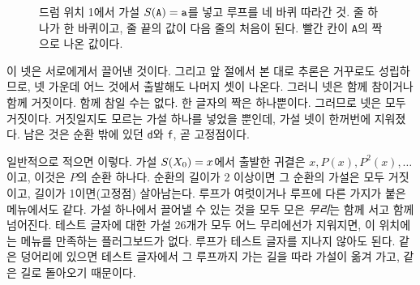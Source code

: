 \begin{figure}[ht]
\centering
{}
\caption{드럼 위치 1에서 가설 $S(\mathtt{A}) = \mathtt{a}$를 넣고 루프를 네 바퀴 따라간 것. 줄 하나가 한 바퀴이고,
줄 끝의 값이 다음 줄의 처음이 된다. 빨간 칸이 \texttt{A}의 짝으로 나온 값이다.}
\label{fig:ac-orbit}
\end{figure}

이 넷은 서로에게서 끌어낸 것이다. 그리고 앞 절에서 본 대로 추론은 거꾸로도 성립하므로, 넷 가운데 어느 것에서
출발해도 나머지 셋이 나온다. 그러니 넷은 함께 참이거나 함께 거짓이다. 함께 참일 수는 없다. 한 글자의 짝은 하나뿐이다.
그러므로 넷은 모두 거짓이다. 거짓일지도 모르는 가설 하나를 넣었을 뿐인데, 가설 넷이 한꺼번에 지워졌다. 남은 것은
순환 밖에 있던 \texttt{d}와 \texttt{f}, 곧 고정점이다.

일반적으로 적으면 이렇다. 가설 $S(X_0) = x$에서 출발한 귀결은 $x, P(x), P^2(x), \ldots$이고, 이것은 $P$의 순환
하나다. 순환의 길이가 2 이상이면 그 순환의 가설은 모두 거짓이고, 길이가 1이면(고정점) 살아남는다. 루프가 여럿이거나
루프에 다른 가지가 붙은 메뉴에서도 같다. 가설 하나에서 끌어낼 수 있는 것을 모두 모은 \emph{무리}는 함께 서고 함께
넘어진다. 테스트 글자에 대한 가설 26개가 모두 어느 무리에선가 지워지면, 이 위치에는 메뉴를 만족하는 플러그보드가
없다. 루프가 테스트 글자를 지나지 않아도 된다. 같은 덩어리에 있으면 테스트 글자에서 그 루프까지 가는 길을 따라
가설이 옮겨 가고, 같은 길로 돌아오기 때문이다.

